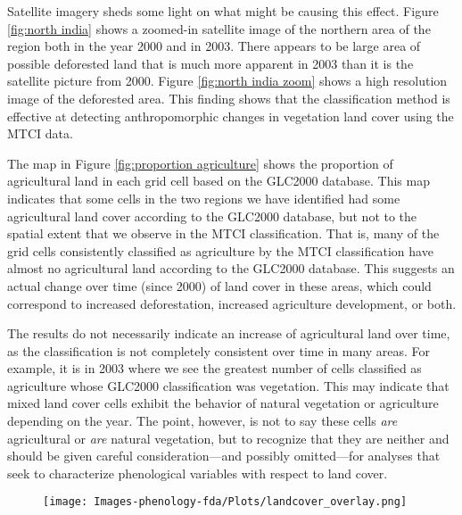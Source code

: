 Satellite imagery sheds some light on what might be causing this effect. Figure \ref{fig:north india} shows a zoomed-in satellite image of the northern area of the region both in the year 2000 and in 2003. There appears to be large area of possible deforested land that is much more apparent in 2003 than it is the satellite picture from 2000. Figure \ref{fig:north india zoom} shows a high resolution image of the deforested area. This finding shows that the classification method is effective at detecting anthropomorphic changes in vegetation land cover using the MTCI data. 

The map in Figure \ref{fig:proportion agriculture} shows the proportion of agricultural land in each grid cell based on the GLC2000 database. This map indicates that some cells in the two regions we have identified had some agricultural land cover according to the GLC2000 database, but not to the spatial extent that we observe in the MTCI classification. That is, many of the grid cells consistently classified as agriculture by the MTCI classification have almost no agricultural land according to the GLC2000 database. This suggests an actual change over time (since 2000) of land cover in these areas, which could correspond to increased deforestation, increased agriculture development, or both. 

The results do not necessarily indicate an increase of agricultural land over time, as the classification is not completely consistent over time in many areas. For example, it is in 2003 where we see the greatest number of cells classified as agriculture whose GLC2000 classification was vegetation. This may indicate that mixed land cover cells exhibit the behavior of natural vegetation or agriculture depending on the year. The point, however, is not to say these cells \emph{are} agricultural or \emph{are} natural vegetation, but to recognize that they are neither and should be given careful consideration---and possibly omitted---for analyses that seek to characterize phenological variables with respect to land cover. 


\label{sec:discussion}


\begin{figure}
	[htbp] \centering 
	\texttt{[image: Images-phenology-fda/Plots/landcover\_overlay.png]} \\
	\label{fig:classification overlay} 
\end{figure}


